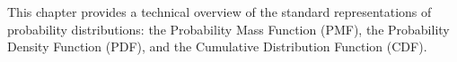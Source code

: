 This chapter provides a technical overview of the standard representations of probability distributions: the Probability Mass Function (PMF), the Probability Density Function (PDF), and the Cumulative Distribution Function (CDF).
